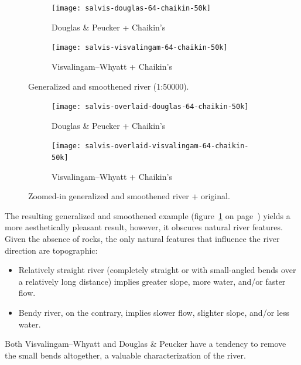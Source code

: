 \documentclass[a4paper]{article}
\newcommand{\onpage}[1]{\ref{#1} on page~\pageref{#1}}
\newcommand{\DP}{Douglas \& Peucker}
\newcommand{\VW}{Visvalingam--Whyatt}
\begin{document}
\begin{figure}[h]
    \centering
    \begin{subfigure}[b]{.49\textwidth}
        \texttt{[image: salvis-douglas-64-chaikin-50k]}
        \caption{{\DP} + Chaikin's}
    \end{subfigure}
    \hfill
    \begin{subfigure}[b]{.49\textwidth}
        \texttt{[image: salvis-visvalingam-64-chaikin-50k]}
        \caption{{\VW} + Chaikin's}
    \end{subfigure}
    \caption{Generalized and smoothened river (1:50000).}
    \label{fig:salvis-generalized-chaikin-50k}
\end{figure}

\begin{figure}[h]
    \centering
    \begin{subfigure}[b]{.49\textwidth}
        \texttt{[image: salvis-overlaid-douglas-64-chaikin-50k]}
        \caption{{\DP} + Chaikin's}
    \end{subfigure}
    \hfill
    \begin{subfigure}[b]{.49\textwidth}
        \texttt{[image: salvis-overlaid-visvalingam-64-chaikin-50k]}
        \caption{{\VW} + Chaikin's}
    \end{subfigure}
    \caption{Zoomed-in generalized and smoothened river + original.}
    \label{fig:salvis-overlaid-generalized-chaikin-50k}
\end{figure}

The resulting generalized and smoothened example
(figure~\onpage{fig:salvis-generalized-chaikin-50k}) yields a more
aesthetically pleasant result, however, it obscures natural river features.
Given the absence of rocks, the only natural features that influence the river
direction are topographic:

\begin{itemize}

    \item Relatively straight river (completely straight or with small-angled
        bends over a relatively long distance) implies greater slope, more
        water, and/or faster flow.

    \item Bendy river, on the contrary, implies slower flow, slighter slope,
        and/or less water.

\end{itemize}

Both {\VW} and {\DP} have a tendency to remove the small bends altogether, a
valuable characterization of the river.
\end{document}
